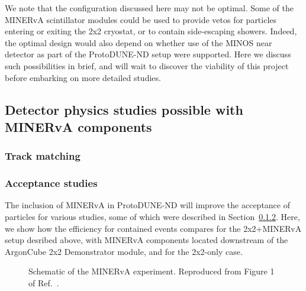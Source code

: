 We note that the configuration discussed here may not be optimal. Some of the MINERvA scintillator modules could be used to provide vetos for particles entering or exiting the 2x2 cryostat, or to contain side-escaping showers. Indeed, the optimal design would also depend on whether use of the MINOS near detector as part of the ProtoDUNE-ND setup were supported. Here we discuss such possibilities in brief, and will wait to discover the viability of this project before embarking on more detailed studies.

\subsection{Detector physics studies possible with MINERvA components}

\subsubsection{Track matching}

\subsubsection{Acceptance studies}

The inclusion of MINERvA in ProtoDUNE-ND will improve the acceptance of particles for various studies, some of which were described in Section~\ref{}. Here, we show how the efficiency for contained events compares for the 2x2+MINERvA setup desribed above, with MINERvA components located downstream of the ArgonCube 2x2 Demonstrator module, and for the 2x2-only case.
\begin{figure}[htb]
  \centering
  \caption{Schematic of the MINERvA experiment. Reproduced from Figure 1 of Ref.~\cite{minerva-nim}.}
  \label{fig:hadronic_containment}
\end{figure}

